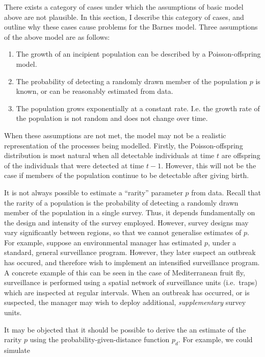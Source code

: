 \documentclass[
]{book}
\providecommand{\tightlist}{%
  \setlength{\itemsep}{0pt}\setlength{\parskip}{0pt}}
\begin{document}
There exists a category of cases under which the assumptions of basic model above are not plausible. In this section, I describe this category of cases, and outline why these cases cause problems for the Barnes model. Three assumptions of the above model are as follows:

\begin{enumerate}
\def\labelenumi{\arabic{enumi}.}
\tightlist
\item
  The growth of an incipient population can be described by a Poisson-offspring model.
\item
  The probability of detecting a randomly drawn member of the population \(p\) is known, or can be reasonably estimated from data.
\item
  The population grows exponentially at a constant rate. I.e. the growth rate of the population is not random and does not change over time.
\end{enumerate}

When these assumptions are not met, the model may not be a realistic representation of the processes being modelled. Firstly, the Poisson-offspring distribution is most natural when all detectable individuals at time \(t\) are offspring of the individuals that were detected at time \(t-1\). However, this will not be the case if members of the population continue to be detectable after giving birth.

It is not always possible to estimate a ``rarity'' parameter \(p\) from data. Recall that the rarity of a population is the probability of detecting a randomly drawn member of the population in a single survey. Thus, it depends fundamentally on the design and intensity of the survey employed. However, survey designs may vary significantly between regions, so that we cannot generalise estimates of \(p\). For example, suppose an environmental manager has estimated \(p\), under a standard, general surveillance program. However, they later suspect an outbreak has occured, and therefore wish to implement an intensified surveillance program. A concrete example of this can be seen in the case of Mediterranean fruit fly, surveillance is performed using a spatial network of surveillance units (i.e.~traps) which are inspected at regular intervals. When an outbreak has occurred, or is suspected, the manager may wish to deploy additional, \emph{supplementary} survey units.

It may be objected that it should be possible to derive the an estimate of the rarity \(p\) using the probability-given-distance function \(p_d\). For example, we could simulate
\end{document}
